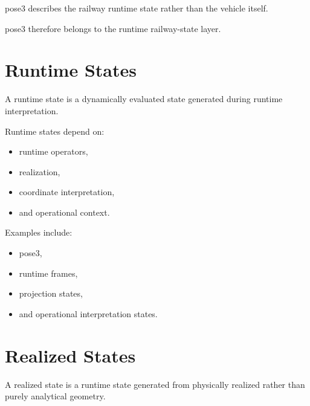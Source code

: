 \begin{remark}
pose3 describes the railway runtime state rather than the vehicle
itself.
\end{remark}

\begin{remark}
pose3 therefore belongs to the runtime railway-state layer.
\end{remark}

\section{Runtime States}

\begin{definition}
\label{def:taxonomy-runtime-state}
A runtime state is a dynamically evaluated state generated during
runtime interpretation.
\end{definition}

\begin{remark}
Runtime states depend on:
\begin{itemize}
\item runtime operators,
\item realization,
\item coordinate interpretation,
\item and operational context.
\end{itemize}
\end{remark}

\begin{remark}
Examples include:
\begin{itemize}
\item pose3,
\item runtime frames,
\item projection states,
\item and operational interpretation states.
\end{itemize}
\end{remark}

\section{Realized States}

\begin{definition}
\label{def:taxonomy-realized-state}
A realized state is a runtime state generated from physically realized
rather than purely analytical geometry.
\end{definition}


